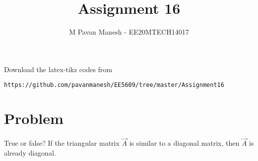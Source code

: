 \documentclass[journal,12pt]{IEEEtran}
\begin{document}
     \def\rightbox#1{\makebox[0in][r]{#1}}
     \def\centbox#1{\makebox[0in]{#1}}
     \def\topbox#1{\raisebox{-\baselineskip}[0in][0in]{#1}}
     \def\midbox#1{\raisebox{-0.5\baselineskip}[0in][0in]{#1}}
\vspace{3cm}
\title{Assignment 16}
\author{M Pavan Manesh - EE20MTECH14017}
\maketitle
\bigskip
\renewcommand{\thefigure}{\theenumi}
\renewcommand{\thetable}{\theenumi}
%
Download the latex-tikz codes from 
%
\begin{lstlisting}
https://github.com/pavanmanesh/EE5609/tree/master/Assignment16
\end{lstlisting}
\section{\textbf{Problem}}
True or false? If the triangular matrix $\vec{A}$ is similar to a diagonal matrix, then $\vec{A}$ is already diagonal.
\end{document}
